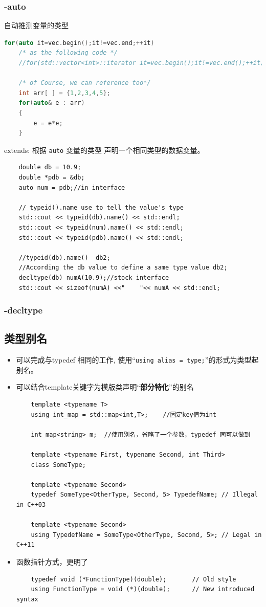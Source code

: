 \documentclass[UTF8,a4paper,12pt]{ctexbook} %
\begin{document}
			\subsubsection{-auto}
			自动推测变量的类型
				\begin{lstlisting}[language=C++]
	for(auto it=vec.begin();it!=vec.end;++it)
	/* as the following code */
	//for(std::vector<int>::iterator it=vec.begin();it!=vec.end();++it)
	
	/* of Course, we can reference too*/
	int arr[ ] = {1,2,3,4,5};
	for(auto& e : arr) 
	{
		e = e*e;
	}				
				\end{lstlisting}
				
				extends: 根据 \verb|auto| 变量的类型 声明一个相同类型的数据变量。
				\begin{lstlisting}
	double db = 10.9;
	double *pdb = &db;
	auto num = pdb;//in interface
	
	// typeid().name use to tell the value's type
	std::cout << typeid(db).name() << std::endl;
	std::cout << typeid(num).name() << std::endl;
	std::cout << typeid(pdb).name() << std::endl;
	
	//typeid(db).name()  db2;
	//According the db value to define a same type value db2;
	decltype(db) numA(10.9);//stock interface
	std::cout << sizeof(numA) <<"    "<< numA << std::endl;										
				\end{lstlisting}
		
			\subsubsection{-decltype}
			
		\subsection{类型别名}
			\begin{itemize}
				\item 可以完成与typedef 相同的工作,  使用“\verb|using alias = type;|”的形式为类型起别名。
				\item 可以结合template关键字为模版类声明“\textbf{部分特化}”的别名
			\begin{lstlisting}
	template <typename T>
	using int_map = std::map<int,T>;	//固定key值为int
	
	int_map<string> m;	//使用别名，省略了一个参数，typedef 同可以做到
	
	template <typename First, typename Second, int Third>
	class SomeType;
	
	template <typename Second>
	typedef SomeType<OtherType, Second, 5> TypedefName; // Illegal in C++03
	
	template <typename Second>
	using TypedefName = SomeType<OtherType, Second, 5>; // Legal in C++11			
			\end{lstlisting}
				\item 函数指针方式，更明了
			\begin{lstlisting}
	typedef void (*FunctionType)(double);       // Old style
	using FunctionType = void (*)(double);      // New introduced syntax			
			\end{lstlisting}
			
			\end{itemize}						
\end{document}
